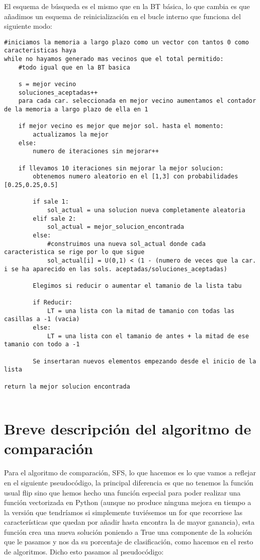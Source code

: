 \documentclass[10pt,a4paper]{article}
\begin{document}
El esquema de búsqueda es el mismo que en la BT básica, lo que cambia es que añadimos un esquema de reinicialización en el bucle interno que funciona del siguiente modo:\\

\begin{lstlisting}
#iniciamos la memoria a largo plazo como un vector con tantos 0 como caracteristicas haya
while no hayamos generado mas vecinos que el total permitido:
	#todo igual que en la BT basica
	
	s = mejor vecino
	soluciones_aceptadas++
	para cada car. seleccionada en mejor vecino aumentamos el contador de la memoria a largo plazo de ella en 1
	
	if mejor vecino es mejor que mejor sol. hasta el momento:
		actualizamos la mejor
	else:
		numero de iteraciones sin mejorar++
		
	if llevamos 10 iteraciones sin mejorar la mejor solucion:
		obtenemos numero aleatorio en el [1,3] con probabilidades [0.25,0.25,0.5]
		
		if sale 1:
			sol_actual = una solucion nueva completamente aleatoria
		elif sale 2:
			sol_actual = mejor_solucion_encontrada
		else:
			#construimos una nueva sol_actual donde cada caracteristica se rige por lo que sigue
			sol_actual[i] = U(0,1) < (1 - (numero de veces que la car. i se ha aparecido en las sols. aceptadas/soluciones_aceptadas)
			
		Elegimos si reducir o aumentar el tamanio de la lista tabu
		
		if Reducir:
			LT = una lista con la mitad de tamanio con todas las casillas a -1 (vacia)
		else:
			LT = una lista con el tamanio de antes + la mitad de ese tamanio con todo a -1
			
		Se insertaran nuevos elementos empezando desde el inicio de la lista
		
return la mejor solucion encontrada
		
\end{lstlisting}
\newpage
\section{\color[rgb]{0.0,0.0,0.21}Breve descripción del algoritmo de comparación}

Para el algoritmo de comparación, SFS, lo que hacemos es lo que vamos a reflejar en el siguiente pseudocódigo, la principal diferencia es que no tenemos la función usual flip sino que hemos hecho una función especial para poder realizar una función vectorizada en Python (aunque no produce ninguna mejora en tiempo a la versión que tendríamos si simplemente tuviésemos un for que recorriese las características que quedan por añadir hasta encontra la de mayor ganancia), esta función crea una nueva solución poniendo a True una componente de la solución que le pasamos y nos da su porcentaje de clasificación, como hacemos en el resto de algoritmos. Dicho esto pasamos al pseudocódigo:
\end{document}
